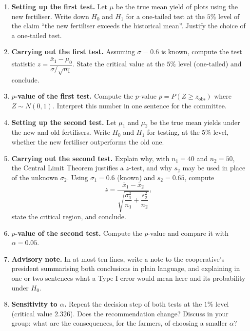 \documentclass[11pt]{article}
\begin{document}
\begin{enumerate}
\item \textbf{Setting up the first test.} Let $\mu$ be the true mean yield of plots using the new fertiliser. Write down $H_0$ and $H_1$ for a one-tailed test at the $5\%$ level of the claim ``the new fertiliser exceeds the historical mean''. Justify the choice of a one-tailed test.

\item \textbf{Carrying out the first test.} Assuming $\sigma = 0.6$ is known, compute the test statistic $z = \dfrac{\bar{x}_1 - \mu_0}{\sigma/\sqrt{n_1}}$. State the critical value at the $5\%$ level (one-tailed) and conclude.

\item \textbf{$p$-value of the first test.} Compute the $p$-value $p = P(Z \geq z_{\text{obs}})$ where $Z \sim N(0,1)$. Interpret this number in one sentence for the committee.

\item \textbf{Setting up the second test.} Let $\mu_1$ and $\mu_2$ be the true mean yields under the new and old fertilisers. Write $H_0$ and $H_1$ for testing, at the $5\%$ level, whether the new fertiliser outperforms the old one.

\item \textbf{Carrying out the second test.} Explain why, with $n_1 = 40$ and $n_2 = 50$, the Central Limit Theorem justifies a $z$-test, and why $s_2$ may be used in place of the unknown $\sigma_2$. Using $\sigma_1 = 0.6$ (known) and $s_2 = 0.65$, compute
\[ z = \frac{\bar{x}_1 - \bar{x}_2}{\sqrt{\dfrac{\sigma_1^2}{n_1} + \dfrac{s_2^2}{n_2}}}, \]
state the critical region, and conclude.

\item \textbf{$p$-value of the second test.} Compute the $p$-value and compare it with $\alpha = 0.05$.

\item \textbf{Advisory note.} In at most ten lines, write a note to the cooperative's president summarising both conclusions in plain language, and explaining in one or two sentences what a Type I error would mean here and its probability under $H_0$.

\item \textbf{Sensitivity to $\alpha$.} Repeat the decision step of both tests at the $1\%$ level (critical value $2.326$). Does the recommendation change? Discuss in your group: what are the consequences, for the farmers, of choosing a smaller $\alpha$?
\end{enumerate}
\end{document}

